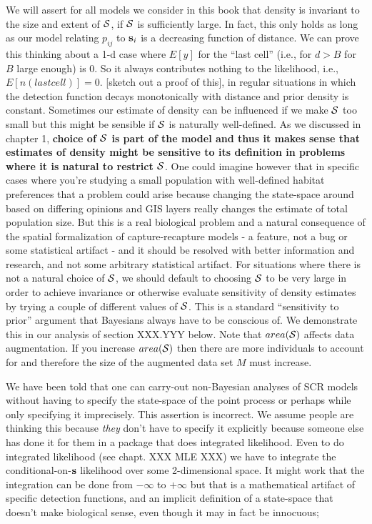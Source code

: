 We will assert for all models we consider in this book that density is
invariant to the size and extent of ${\cal S}$, if ${\cal S}$ is sufficiently large. In
fact, this only holds as long as our model relating $p_{ij}$ to ${\bf
  s}_{i}$ is a decreasing function of distance.  We can prove this
thinking about a 1-d case where $E[y]$ for the ``last cell'' (i.e.,
for $d>B$ for $B$ large enough) is 0. So it always contributes nothing to
the likelihood, i.e., $E[n(last cell)] = 0$. [sketch out a proof of
this], in regular situations in which the detection function decays
monotonically with distance and prior density is constant.  Sometimes
our estimate of density can be influenced if we make ${\cal S}$ too small but
this might be sensible if ${\cal S}$ is naturally well-defined. As we discussed
in chapter 1, {\bf choice of ${\cal S}$ is part of the model and thus it makes
  sense that estimates of density might be sensitive to its definition
  in problems where it is natural to restrict ${\cal S}$}.  
One could imagine
however that in specific cases where you're studying a small
population with well-defined habitat preferences that a problem could
arise because changing the state-space around based on differing
opinions and GIS layers really changes the estimate of total
population size. But this is a real biological problem and a natural
consequence of the spatial formalization of capture-recapture models -
a feature, not a bug or some statistical artifact - and it should be
resolved with better information and research, and not some arbitrary
statistical artifact.  For situations where there is not a natural
choice of ${\cal S}$, we should default to choosing ${\cal S}$ to be very large in order
to achieve invariance or otherwise evaluate sensitivity of density
estimates by trying a couple of different values of ${\cal S}$. This is a
standard ``sensitivity to prior'' argument that Bayesians always have
to be conscious of.  We demonstrate this in our analysis of section
XXX.YYY below. Note that $area({\cal S})$ affects data augmentation. If you
increase $area({\cal S})$ then there are more individuals to account for and
therefore the size of the augmented data set $M$ must increase.

We have been told that one can carry-out non-Bayesian analyses of SCR
models without having to specify the state-space of the point process
or perhaps while only specifying it imprecisely.  This assertion is
incorrect. We assume people are thinking this because {\it they} don't
have to specify it explicitly because someone else has done it for
them in a package that does integrated likelihood. Even to do
integrated likelihood (see chapt. XXX MLE XXX) we have to integrate the
conditional-on-${\bf s}$ likelihood over some 2-dimensional space.  It might
work that the integration can be done from $-\infty$ to $+\infty$ but
that is a mathematical artifact of specific detection functions, and
an implicit definition of a state-space that doesn't make biological
sense, even though it may in fact be innocuous;


